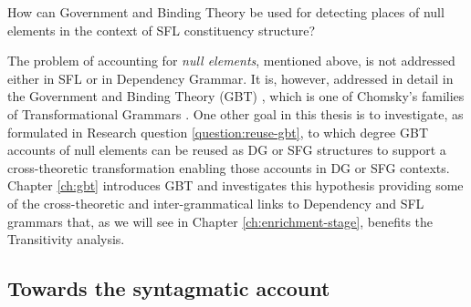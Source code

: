     \begin{question}\label{question:reuse-gbt}
        How can Government and Binding Theory be used for detecting places of null elements in the context of SFL constituency structure?
    \end{question}
    
    
    The problem of accounting for \textit{null elements}, mentioned above, is not addressed either in SFL or in Dependency Grammar. It is, however, addressed in detail in the Government and Binding Theory (GBT) \citep{Chomsky81,Haegeman1991}, which is one of Chomsky's families of Transformational Grammars \citep{ Chomsky57}. One other goal in this thesis is to investigate, as formulated in Research question \ref{question:reuse-gbt}, to which degree GBT accounts of null elements can be reused as DG or SFG structures to support a cross-theoretic transformation enabling those accounts in DG or SFG contexts. Chapter \ref{ch:gbt} introduces GBT and investigates this hypothesis providing some of the cross-theoretic and inter-grammatical links to Dependency and SFL grammars that, as we will see in Chapter \ref{ch:enrichment-stage}, benefits the Transitivity analysis.
    

\subsection{Towards the syntagmatic account}
\label{sec:syntagmatic-account}
    
